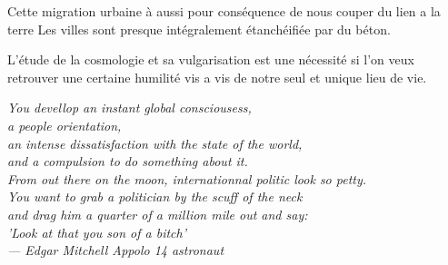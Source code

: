Cette migration urbaine à aussi pour conséquence de nous couper du lien a la terre
Les villes sont presque intégralement étanchéifiée par du béton.

L'étude de la cosmologie et sa vulgarisation est une nécessité si l'on veux retrouver une certaine humilité vis a vis de notre seul et unique lieu de vie.


\vspace{0.5cm}


\begin{flushright}{\slshape    
	You devellop an instant global consciousess, \\
	a people orientation,\\
	an intense dissatisfaction with the state of the world,\\
	and a compulsion to do something about it.\\
	From out there on the moon, internationnal politic look so petty. \\
	You want to grab a politician by the scuff of the neck\\
	and drag him a quarter of a million mile out and say: \\
	'Look at that you son of a bitch'\\ \medskip 
	--- Edgar Mitchell Appolo 14 astronaut }
\end{flushright}